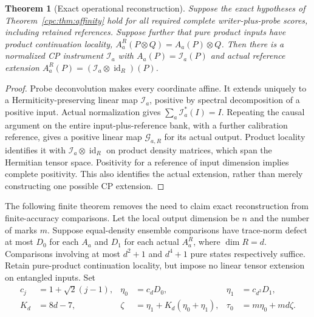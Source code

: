 \documentclass[11pt,oneside,openany]{book}
\newtheorem{theorem}{Theorem}[chapter]
\theoremstyle{definition}
\theoremstyle{remark}\newtheorem{remark}[theorem]{Remark}
\begin{document}
\begin{theorem}[Exact operational reconstruction]
\label{cpc:thm:exactcp}
Suppose the exact hypotheses of Theorem~\ref{cpc:thm:affinity} hold for all required complete writer-plus-probe scores, including retained references. Suppose further that pure product inputs have product continuation locality,
$A_a^R(P\otimes Q)=A_a(P)\otimes Q$.
Then there is a normalized CP instrument $\mathcal I_a$ with
$A_a(P)=\mathcal I_a(P)$ and actual reference extension
$A_a^R(P)= (\mathcal I_a\otimes\operatorname{id}_R)(P)$.
\end{theorem}
\begin{proof}
Probe deconvolution makes every coordinate affine. It extends uniquely to a Hermiticity-preserving linear map $\mathcal I_a$, positive by spectral decomposition of a positive input. Actual normalization gives $\sum_a\mathcal I_a^*(I)=I$. Repeating the causal argument on the entire input-plus-reference bank, with a further calibration reference, gives a positive linear map $\mathcal G_{a,R}$ for its actual output. Product locality identifies it with $\mathcal I_a\otimes\operatorname{id}_R$ on product density matrices, which span the Hermitian tensor space. Positivity for a reference of input dimension implies complete positivity. This also identifies the actual extension, rather than merely constructing one possible CP extension.
\end{proof}

The following finite theorem removes the need to claim exact reconstruction from finite-accuracy comparisons. Let the local output dimension be $n$ and the number of marks $m$. Suppose equal-density ensemble comparisons have trace-norm defect at most $D_0$ for each $A_a$ and $D_1$ for each actual $A_a^R$, where $\dim R=d$. Comparisons involving at most $d^2+1$ and $d^4+1$ pure states respectively suffice. Retain pure-product continuation locality, but impose no linear tensor extension on entangled inputs. Set
\begin{align}
 c_j&=1+\sqrt2(j-1),&\eta_0&=c_dD_0,&\eta_1&=c_{d^2}D_1,\nonumber\\
 K_d&=8d-7,&\zeta&=\eta_1+K_d(\eta_0+\eta_1),&
 \tau_0&=m\eta_0+md\zeta.
 \label{cpc:eq:repairconstants}
\end{align}
\end{document}

